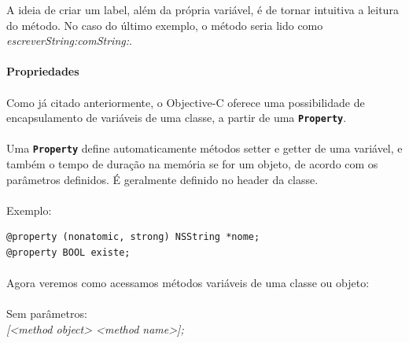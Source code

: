 \documentclass[a4paper,12pt,brazil,doubleside]{book}
\begin{document}
\bigskip

A ideia de criar um label, além da própria variável, é de tornar intuitiva a leitura do método. No caso do último exemplo, o método seria lido como \emph{escreverString:comString:}.

\bigskip

\paragraph{}\textbf{Propriedades}

\paragraph{}Como já citado anteriormente, o Objective-C oferece uma possibilidade de encapsulamento de variáveis de uma classe, a partir de uma \texttt{\textbf{Property}}.
\paragraph{}Uma \texttt{\textbf{Property}} define automaticamente métodos setter e getter de uma variável, e também o tempo de duração na memória se for um objeto, de acordo com os parâmetros definidos. É geralmente definido no header da classe.
\paragraph{}Exemplo:

\begin{listing}
\begin{verbatim}
@property (nonatomic, strong) NSString *nome;
@property BOOL existe;
\end{verbatim}
\end{listing}

\bigskip
\bigskip

\paragraph{}Agora veremos como acessamos métodos variáveis de uma classe ou objeto:\\

\paragraph{}Sem parâmetros:\\
\emph{[<method object> <method name>];}\\
\end{document}
